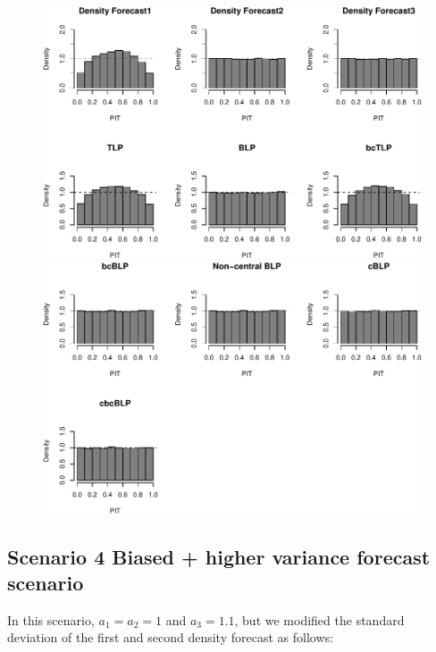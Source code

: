 \documentclass[]{article}
\begin{document}
\begin{figure}[H]

{\centering \includegraphics{Newest_BLPsim_files/figure-latex/unnamed-chunk-13-1} \includegraphics{Newest_BLPsim_files/figure-latex/unnamed-chunk-13-2} 

}

\end{figure}

\clearpage

\hypertarget{scenario-4-biased-higher-variance-forecast-scenario}{%
\subsection{Scenario 4 Biased + higher variance forecast
scenario}\label{scenario-4-biased-higher-variance-forecast-scenario}}

In this scenario, \(a_1 = a_2 = 1\) and \(a_3 = 1.1\), but we modified
the standard deviation of the first and second density forecast as
follows:
\end{document}
